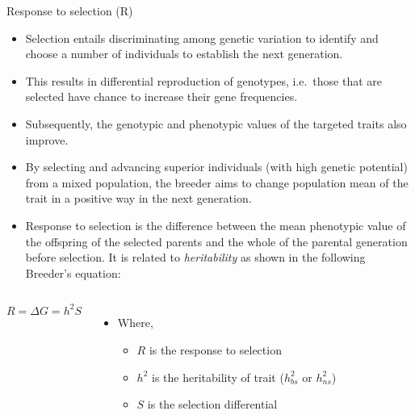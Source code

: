 \documentclass[11pt,ignorenonframetext,aspectratio=169]{beamer}
\providecommand{\tightlist}{%
  \setlength{\itemsep}{0pt}\setlength{\parskip}{0pt}}
\newcommand{\bcolumns}{\begin{columns}[T, onlytextwidth]}
\newcommand{\ecolumns}{\end{columns}}
\begin{document}
\begin{frame}{Response to selection (R)}
\protect\hypertarget{response-to-selection-r}{}
\small

\begin{itemize}
\tightlist
\item
  Selection entails discriminating among genetic variation to identify
  and choose a number of individuals to establish the next generation.
\item
  This results in differential reproduction of genotypes, i.e.~those
  that are selected have chance to increase their gene frequencies.
\item
  Subsequently, the genotypic and phenotypic values of the targeted
  traits also improve.
\item
  By selecting and advancing superior individuals (with high genetic
  potential) from a mixed population, the breeder aims to change
  population mean of the trait in a positive way in the next generation.
\item
  \alert{Response to selection} is the difference between the mean
  phenotypic value of the offspring of the selected parents and the
  whole of the parental generation before selection. It is related to
  \emph{heritability} as shown in the following
  \alert{Breeder's equation}:
\end{itemize}

\bcolumns
{}

\[
R = \Delta G = h^2 S
\] 

\begin{itemize}
\tightlist
\item
  Where,

  \begin{itemize}
  \footnotesize
  \item $R$ is the response to selection
  \item $h^2$ is the heritability of trait ($h^2_{bs}$ or $h^2_{ns}$)
  \item $S$ is the selection differential
  \end{itemize}
\end{itemize}

\ecolumns
\end{frame}
\end{document}
